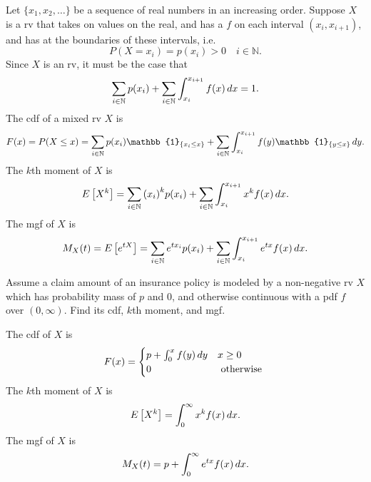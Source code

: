 \documentclass[notoc,notitlepage]{tufte-book}
\begin{document}
\begin{note}
  Let $\{ x_1, x_2, \ldots \}$ be a sequence of real numbers in an increasing order. Suppose $X$ is a rv that takes on values on the real, and has a  $f$ on each interval $(x_i, x_{i + 1})$, and has  at the boundaries of these intervals, i.e.
  \begin{equation*}
    P(X = x_i) = p(x_i) > 0 \quad i \in \mathbb{N}.
  \end{equation*}
  Since $X$ is an rv, it must be the case that
  \begin{equation*}
    \sum_{i \in \mathbb{N}} p(x_i) + \sum_{i \in \mathbb{N}} \int_{x_i}^{x_{i + 1}} f(x) \mathop{}\!d{x}  = 1.
  \end{equation*}
  The cdf of a mixed rv $X$ is
  \begin{equation*}
    F(x) = P(X \leq x) = \sum_{i \in \mathbb{N}} p(x_i) \mathbb{1}_{\{x_i \leq x\}} + \sum_{i \in \mathbb{N}} \int_{x_i}^{x_{i + 1}} f(y) \mathbb{1}_{\{ y \leq x \} } \dif{y}.
  \end{equation*}
  The $k$th moment of $X$ is
  \begin{equation*}
    E\left[X^k\right] = \sum_{i \in \mathbb{N}} {(x_i)}^k p(x_i) + \sum_{i \in \mathbb{N}} \int_{x_i}^{x_{i + 1}} x^k f(x) \mathop{}\!d{x}.
  \end{equation*}
  The mgf of $X$ is
  \begin{equation*}
    M_X(t) = E\left[ e^{tX} \right] = \sum_{i \in \mathbb{N}} e^{tx_i} p(x_i) + \sum_{i \in \mathbb{N}} \int_{x_i}^{x_{i + 1}} e^{tx} f(x) \mathop{}\!d{x}.
  \end{equation*}
\end{note}

\begin{eg}
  Assume a claim amount of an insurance policy is modeled by a non-negative rv $X$ which has probability mass of $p$ and $0$, and otherwise continuous with a pdf $f$ over $(0, \infty)$. Find its cdf, $k$th moment, and mgf.
\end{eg}

\begin{solution}
  The cdf of $X$ is
  \begin{equation*}
    F(x) = \begin{cases}
      p + \int_{0}^{x} f(y) \mathop{}\!d{y} & x \geq 0 \\
      0                             & \text{ otherwise }
    \end{cases}
  \end{equation*}
  The $k$th moment of $X$ is
  \begin{equation*}
    E\left[ X^k \right] = \int_{0}^{\infty} x^k f(x) \mathop{}\!d{x}.
  \end{equation*}
  The mgf of $X$ is
  \begin{equation*}
    M_X(t) = p + \int_{0}^{\infty} e^{tx} f(x) \mathop{}\!d{x}.
  \end{equation*}
\end{solution}
\end{document}
